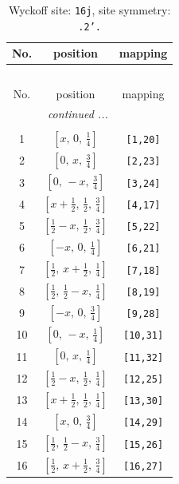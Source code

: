 \documentclass[fleqn,8pt]{jsarticle}
\begin{document}
\renewcommand{\arraystretch}{1.2}
\begin{longtable}{ccc}
\caption{Wyckoff site: {\tt 16j}, site symmetry: {\tt .2'.}}
 \\
 \hline \hline
No. & position & mapping \\ \hline \endfirsthead

\multicolumn{2}{l}{\tablename\ \thetable{}} \\
 \hline \hline
No. & position & mapping \\ \hline \endhead

 \hline \hline
\multicolumn{2}{r}{\footnotesize\it continued ...} \\ \endfoot

 \hline \hline
\multicolumn{2}{r}{} \\ \endlastfoot

1 & $\left[ x,\, 0,\, \frac{1}{4} \right]$ & {\tt [1,20]} \\ \hline
2 & $\left[ 0,\, x,\, \frac{3}{4} \right]$ & {\tt [2,23]} \\ \hline
3 & $\left[ 0,\, - x,\, \frac{3}{4} \right]$ & {\tt [3,24]} \\ \hline
4 & $\left[ x + \frac{1}{2},\, \frac{1}{2},\, \frac{3}{4} \right]$ & {\tt [4,17]} \\ \hline
5 & $\left[ \frac{1}{2} - x,\, \frac{1}{2},\, \frac{3}{4} \right]$ & {\tt [5,22]} \\ \hline
6 & $\left[ - x,\, 0,\, \frac{1}{4} \right]$ & {\tt [6,21]} \\ \hline
7 & $\left[ \frac{1}{2},\, x + \frac{1}{2},\, \frac{1}{4} \right]$ & {\tt [7,18]} \\ \hline
8 & $\left[ \frac{1}{2},\, \frac{1}{2} - x,\, \frac{1}{4} \right]$ & {\tt [8,19]} \\ \hline
9 & $\left[ - x,\, 0,\, \frac{3}{4} \right]$ & {\tt [9,28]} \\ \hline
10 & $\left[ 0,\, - x,\, \frac{1}{4} \right]$ & {\tt [10,31]} \\ \hline
11 & $\left[ 0,\, x,\, \frac{1}{4} \right]$ & {\tt [11,32]} \\ \hline
12 & $\left[ \frac{1}{2} - x,\, \frac{1}{2},\, \frac{1}{4} \right]$ & {\tt [12,25]} \\ \hline
13 & $\left[ x + \frac{1}{2},\, \frac{1}{2},\, \frac{1}{4} \right]$ & {\tt [13,30]} \\ \hline
14 & $\left[ x,\, 0,\, \frac{3}{4} \right]$ & {\tt [14,29]} \\ \hline
15 & $\left[ \frac{1}{2},\, \frac{1}{2} - x,\, \frac{3}{4} \right]$ & {\tt [15,26]} \\ \hline
16 & $\left[ \frac{1}{2},\, x + \frac{1}{2},\, \frac{3}{4} \right]$ & {\tt [16,27]} \\
\end{longtable}
\end{document}
